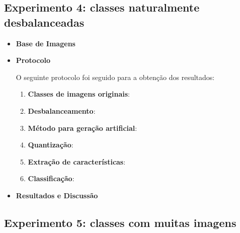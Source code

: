 \FloatBarrier
\subsection{Experimento 4: classes naturalmente desbalanceadas}

\begin{itemize}
\item[] \textbf{Base de Imagens}


\item[] \textbf{Protocolo}

O seguinte protocolo foi seguido para a obtenção dos resultados:

\begin{enumerate}
\item \textbf{Classes de imagens originais}:
\item \textbf{Desbalanceamento}:
\item \textbf{Método para geração artificial}:
\item \textbf{Quantização}:
\item \textbf{Extração de características}:
\item \textbf{Classificação}:
\end{enumerate}
\item[] \textbf{Resultados e Discussão}

\end{itemize}

\FloatBarrier
\subsection{Experimento 5: classes com muitas imagens}

